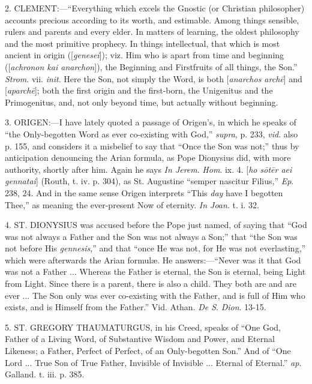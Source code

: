2. CLEMENT:—``Everything which excels
the Gnostic (or Christian philosopher) accounts precious according to
its worth, and estimable. Among things sensible, rulers and parents
and every elder. In matters of learning, the oldest philosophy and the
most primitive prophecy. In things intellectual, that which is most
ancient in origin ([\emph{genesei}]); viz. Him who is apart from time
and beginning ([\emph{achronon kai anarchon}]), the Beginning
and Firstfruits of all things, the Son.'' \emph{Strom}. vii. \emph{init}.
Here the Son, not simply the Word, is both [\emph{anarchos arch\={e}}]
and [\emph{aparch\={e}}]; both the first origin and the first-born,
the Unigenitus and the Primogenitus, and, not only beyond time, but
actually without beginning.

3. ORIGEN:—I have lately quoted a passage
of Origen's, in which he speaks of ``the Only-begotten Word as
ever co-existing with God,'' \emph{supra}, p. 233, \emph{vid}.
also p. 155, and considers it a misbelief to say that ``Once the
Son was not;'' thus by anticipation denouncing the Arian formula,
as Pope Dionysius did, with more authority, shortly after him. Again
he says \emph{In Jerem}. \emph{Hom}. ix. 4. [\emph{ho s\={o}t\={e}r
aei gennatai}] (Routh, t. iv. p. 304), as St. Augustine ``semper
nascitur Filius,'' \emph{Ep}. 238, 24. And in the same sense
Origen interprets ``This \emph{day} have I begotten Thee,'' as
meaning the ever-present Now of eternity. \emph{In Joan}. t. i. 32.

4. ST. DIONYSIUS was
accused before the Pope just named, of saying that ``God was not
always a Father and the Son was not always a Son;'' that ``the
Son was not before His \emph{gennesis},'' and that ``once He
was not, for He was not everlasting,'' which were afterwards the
Arian formulæ. He answers:—``Never was it that God was not a
Father ... Whereas the Father is eternal, the Son is eternal, being
Light from Light. Since there is a parent, there is also a child. They
both are and are ever ... The Son only was ever co-existing with the
Father, and is full of Him who exists, and is Himself from the
Father.'' Vid. Athan. \emph{De S}. \emph{Dion}. 13-15.

5. ST. GREGORY THAUMATURGUS,
in his Creed, speaks of ``One God, Father of a Living Word, of
Substantive Wisdom and Power, and Eternal Likeness; a Father, Perfect
of Perfect, of an Only-begotten Son.'' And of ``One Lord ...
True Son of True Father, Invisible of Invisible ... Eternal of
Eternal.'' \emph{ap}. Galland. t. iii. p. 385.

